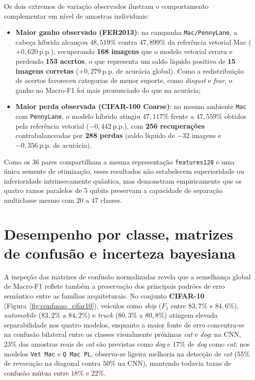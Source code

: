 \documentclass[
    12pt,
    openright,
    oneside,
    a4paper,
    english,
    brazil
]{abntex2}
\begin{document}
Os dois extremos de variação observados ilustram o comportamento complementar em nível de amostras individuais:
\begin{itemize}
    \item \textbf{Maior ganho observado (FER2013)}: na campanha \texttt{Mac/PennyLane}, a cabeça híbrida alcançou \(48{,}519\%\) contra \(47{,}899\%\) da referência vetorial Mac (\(+0{,}620~\text{p.p.}\)), recuperando \textbf{168 imagens} que o modelo vetorial errava e perdendo \textbf{153 acertos}, o que representa um saldo líquido positivo de \textbf{15 imagens corretas} (\(+0{,}279~\text{p.p.}\) de acurácia global). Como a redistribuição de acertos favoreceu categorias de menor suporte, como \textit{disgust} e \textit{fear}, o ganho no Macro-F1 foi mais pronunciado do que na acurácia;
    \item \textbf{Maior perda observada (CIFAR-100 Coarse)}: no mesmo ambiente \texttt{Mac} com \texttt{PennyLane}, o modelo híbrido atingiu \(47{,}117\%\) frente a \(47{,}559\%\) obtidos pela referência vetorial (\(-0{,}442~\text{p.p.}\)), com \textbf{256 recuperações} contrabalanceadas por \textbf{288 perdas} (saldo líquido de \(-32\) imagens e \(-0{,}356~\text{p.p.}\) de acurácia).
\end{itemize}

Como os 36 pares compartilham a mesma representação \texttt{features128} e uma única semente de otimização, esses resultados não estabelecem superioridade ou inferioridade intrinsecamente quântica, mas demonstram empiricamente que os quatro ramos paralelos de 5 qubits preservam a capacidade de separação multiclasse mesmo com 20 a 47 classes.

\section{Desempenho por classe, matrizes de confusão e incerteza bayesiana}

A inspeção das matrizes de confusão normalizadas revela que a semelhança global de Macro-F1 reflete também a preservação dos principais padrões de erro semântico entre as famílias arquiteturais. No conjunto \textbf{CIFAR-10} (Figura~\ref{fig:confusao_cifar10}), veículos como \textit{ship} (\(F_1\) entre \(83{,}7\%\) e \(84{,}6\%\)), \textit{automobile} (\(83{,}2\%\) a \(84{,}2\%\)) e \textit{truck} (\(80{,}3\%\) a \(80{,}8\%\)) atingem elevada separabilidade nos quatro modelos, enquanto a maior fonte de erro concentra-se na confusão bilateral entre as classes visualmente próximas \textit{cat} e \textit{dog}: na CNN, \(23\%\) das amostras reais de \textit{cat} são previstas como \textit{dog} e \(17\%\) de \textit{dog} como \textit{cat}; nos modelos \texttt{Vet Mac} e \texttt{Q Mac PL}, observa-se ligeira melhoria na detecção de \textit{cat} (\(55\%\) de revocação na diagonal contra \(50\%\) na CNN), mantendo todavia taxas de confusão mútua entre \(18\%\) e \(22\%\).
\end{document}
